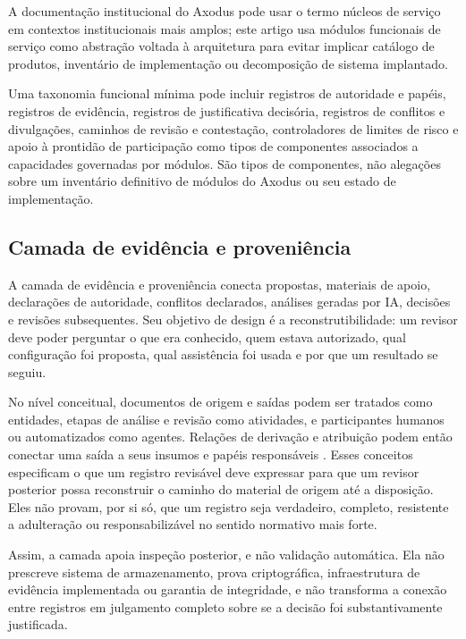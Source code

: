 \documentclass[11pt]{article}
\begin{document}
A documentação institucional do Axodus pode usar o termo núcleos de serviço em
contextos institucionais mais amplos; este artigo usa módulos funcionais de
serviço como abstração voltada à arquitetura para evitar implicar catálogo de
produtos, inventário de implementação ou decomposição de sistema implantado.

Uma taxonomia funcional mínima pode incluir registros de autoridade e papéis,
registros de evidência, registros de justificativa decisória, registros de
conflitos e divulgações, caminhos de revisão e contestação, controladores de
limites de risco e apoio à prontidão de participação como tipos de componentes
associados a capacidades governadas por módulos. São tipos de componentes, não
alegações sobre um inventário definitivo de módulos do Axodus ou seu estado de
implementação.

\subsection{Camada de evidência e proveniência}

A camada de evidência e proveniência conecta propostas, materiais de apoio,
declarações de autoridade, conflitos declarados, análises geradas por IA,
decisões e revisões subsequentes. Seu objetivo de design é a
reconstrutibilidade: um revisor deve poder perguntar o que era conhecido, quem
estava autorizado, qual configuração foi proposta, qual assistência foi usada
e por que um resultado se seguiu.

No nível conceitual, documentos de origem e saídas podem ser tratados como
entidades, etapas de análise e revisão como atividades, e participantes
humanos ou automatizados como agentes. Relações de derivação e atribuição
podem então conectar uma saída a seus insumos e papéis responsáveis
\citep{w3c2013provdm}. Esses conceitos especificam o que um registro revisável
deve expressar para que um revisor posterior possa reconstruir o caminho do
material de origem até a disposição. Eles não provam, por si só, que um
registro seja verdadeiro, completo, resistente a adulteração ou
responsabilizável no sentido normativo mais forte.

Assim, a camada apoia inspeção posterior, e não validação automática. Ela não
prescreve sistema de armazenamento, prova criptográfica, infraestrutura de
evidência implementada ou garantia de integridade, e não transforma a conexão
entre registros em julgamento completo sobre se a decisão foi
substantivamente justificada.
\end{document}
